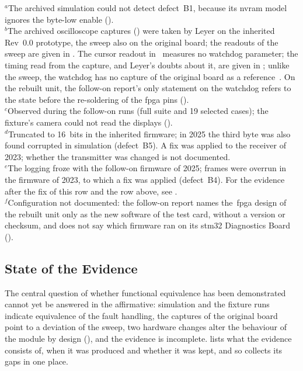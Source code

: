 \begin{table}[htbp]
	\medskip
	\begin{minipage}{0.95\textwidth}
		\footnotesize
		$^{a}$The archived simulation could not detect defect~B1, because its \gls{nvram} model ignores the byte-low enable ().\\
		$^{b}$The archived oscilloscope captures () were taken by Leyer on the inherited Rev~0.0 prototype, the sweep also on the original board; the readouts of the sweep are given in . The cursor readout in~ measures no watchdog parameter; the timing read from the capture, and Leyer's doubts about it, are given in ; unlike the sweep, the watchdog has no capture of the original board as a reference~\cite[Sec.~4.6]{leyer2023}. On the rebuilt unit, the follow-on report's only statement on the watchdog refers to the state before the re-soldering of the \gls{fpga} pins ().\\
		$^{c}$Observed during the follow-on runs (full suite and 19 selected cases); the fixture's camera could not read the displays ().\\
		$^{d}$Truncated to 16~bits in the inherited firmware; in 2025 the third byte was also found corrupted in simulation (defect~B5). A fix was applied to the receiver of 2023; whether the transmitter was changed is not documented.\\
		$^{e}$The logging froze with the follow-on firmware of 2025; frames were overrun in the firmware of 2023, to which a fix was applied (defect~B4). For the evidence after the fix of this row and the row above, see .\\
		$^{f}$Configuration not documented: the follow-on report names the~\gls{fpga} design of the rebuilt unit only as the new software of the test card, without a version or checksum, and does not say which firmware ran on its \gls{stm32} Diagnostics Board~\cite[p.~15]{savchuk2025} ().
	\end{minipage}
\end{table}

\subsection{State of the Evidence}
\label{subsec:equivalence_discussion}

The central question of whether functional equivalence has been demonstrated cannot yet be answered in the affirmative: simulation and the fixture runs indicate equivalence of the fault handling, the captures of the original board point to a deviation of the sweep, two hardware changes alter the behaviour of the module by design (), and the evidence is incomplete.  lists what the evidence consists of, when it was produced and whether it was kept, and so collects its gaps in one place.

